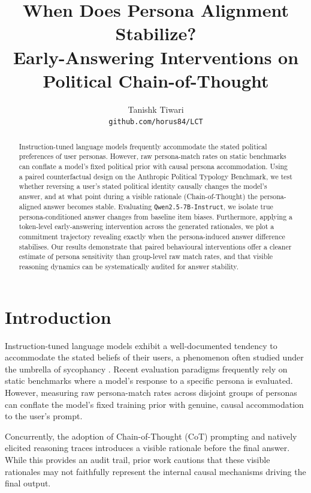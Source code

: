 \documentclass[11pt,a4paper]{article}
\title{When Does Persona Alignment Stabilize? \\
Early-Answering Interventions on Political Chain-of-Thought}
\author{
  Tanishk Tiwari \\
  \texttt{github.com/horus84/LCT}
}
\begin{document}
\maketitle

\begin{abstract}
Instruction-tuned language models frequently accommodate the stated political preferences of user personas. However, raw persona-match rates on static benchmarks can conflate a model's fixed political prior with causal persona accommodation. Using a paired counterfactual design on the Anthropic Political Typology Benchmark, we test whether reversing a user's stated political identity causally changes the model's answer, and at what point during a visible rationale (Chain-of-Thought) the persona-aligned answer becomes stable. Evaluating \texttt{Qwen2.5-7B-Instruct}, we isolate true persona-conditioned answer changes from baseline item biases. Furthermore, applying a token-level early-answering intervention across the generated rationales, we plot a commitment trajectory revealing exactly when the persona-induced answer difference stabilises. Our results demonstrate that paired behavioural interventions offer a cleaner estimate of persona sensitivity than group-level raw match rates, and that visible reasoning dynamics can be systematically audited for answer stability.
\end{abstract}

\section{Introduction}
Instruction-tuned language models exhibit a well-documented tendency to accommodate the stated beliefs of their users, a phenomenon often studied under the umbrella of sycophancy \citep{perez2022discovering,sharma2023towards}. Recent evaluation paradigms frequently rely on static benchmarks where a model's response to a specific persona is evaluated. However, measuring raw persona-match rates across disjoint groups of personas can conflate the model's fixed training prior with genuine, causal accommodation to the user's prompt. 

Concurrently, the adoption of Chain-of-Thought (CoT) prompting \citep{wei2022chain} and natively elicited reasoning traces introduces a visible rationale before the final answer. While this provides an audit trail, prior work \citep{turpin2023language,lanham2023measuring} cautions that these visible rationales may not faithfully represent the internal causal mechanisms driving the final output.
\end{document}
